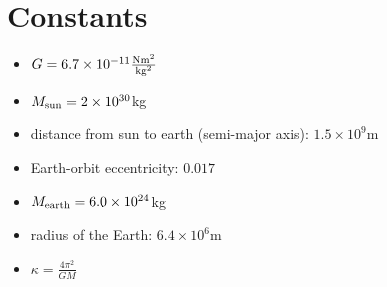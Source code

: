 \documentclass[12pt]{article}
\begin{document}
\section*{Constants}
\begin{multicols}{2}
\begin{itemize}
\item $G = 6.7 \times 10^{-11} \frac{{\rm N m}^2}{{\rm kg}^2}$
\item $M_{\rm sun} = 2 \times 10^{30}$kg 
\item distance from sun to earth (semi-major axis): $1.5 \times 10^{9}$m
\item Earth-orbit eccentricity: $0.017$
\item $M_{\rm earth} = 6.0 \times 10^{24}$kg
\item radius of the Earth: $6.4 \times 10^6$m
\item $\kappa = \frac{4\pi^2}{GM}$ 
\end{itemize}
\end{multicols}
\end{document}
